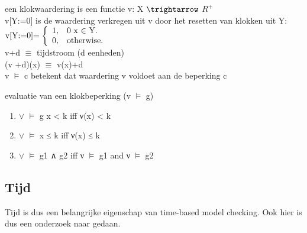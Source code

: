 \documentclass{article}
\begin{document}
	een klokwaardering is een functie v: X $\trightarrow$ $R^+$ \\
	v[Y:=0] is de waardering verkregen uit v door het resetten van klokken uit Y: \\
	
	\begin{math}
		$v[Y:=0]$=\left\{
		\begin{array}{ll}
			1, & \mbox{0 x $\in$ Y}.\\
			0, & \mbox{otherwise}.
		\end{array}
		\right.
	\end{math}
	\\
	
	v+d $\equiv$ tijdstroom (d eenheden) \\
	(v +d)(x) $\equiv$ v(x)+d \\
	v $\models$ c betekent dat waardering v voldoet aan de beperking c
	
	evaluatie van een klokbeperking (v $\models$ g) \\
	\begin{enumerate}
		\item $\vee$ $\models$ g x  < k iff ν(x) < k
		\item $\vee$ $\models$ x ≤ k iff ν(x) ≤ k
		\item $\vee$ $\models$ g1 ∧ g2 iff ν $\models$ g1 and ν $\models$ g2
	\end{enumerate} 
	\subsection{Tijd}
	Tijd is dus een belangrijke eigenschap van time-based model checking. Ook hier is dus een onderzoek naar gedaan.
	\cite{wangUppaal}
	\cite{dtuUppaal}
	\cite{UPPAAL40sMALLTutorial}
	\cite{GrunskebehaviorRealtime}
	\cite{mohammedconcurrentVerification}
	\cite{JaghooriSchedulability}
	\cite{fritscheckingEmbedded}
	\cite{SlompUppaalControlFlow}
	\cite{LaursenRailwayInterlocking}
	\cite{ayaidaUppaalInteroperability}
	\cite{changformalModelCheck}
	\cite{Buitverification}
	\cite{MorichettaMobileComputation}
	\cite{KarstensVerificationLift}
	\cite{TsiopoulosrealtimeConcurrent}
	\cite{AlexandreTimedAutomata}
	\cite{KusumotoUppaalConsidering}
	\cite{StenhLibCoverage}
	\cite{ElkadiAutonomousProtocols}
	\cite{SiavashiUppaalRobustness}
	\cite{FabianVerification}
	\cite{caiStatsDBModel}
\end{document}
